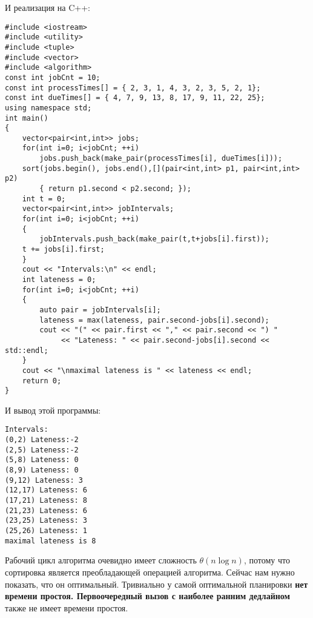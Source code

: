 \vspace{\baselineskip}
И реализация на C++:

\vspace{\baselineskip}
\begin{tcolorbox}
\begin{verbatim}
#include <iostream>
#include <utility>
#include <tuple>
#include <vector>
#include <algorithm>
const int jobCnt = 10;
const int processTimes[] = { 2, 3, 1, 4, 3, 2, 3, 5, 2, 1};
const int dueTimes[] = { 4, 7, 9, 13, 8, 17, 9, 11, 22, 25};
using namespace std;
int main()
{
	vector<pair<int,int>> jobs;
	for(int i=0; i<jobCnt; ++i)
		jobs.push_back(make_pair(processTimes[i], dueTimes[i]));
	sort(jobs.begin(), jobs.end(),[](pair<int,int> p1, pair<int,int> p2)
		{ return p1.second < p2.second; });
	int t = 0;
	vector<pair<int,int>> jobIntervals;
	for(int i=0; i<jobCnt; ++i)
	{
		jobIntervals.push_back(make_pair(t,t+jobs[i].first));
	t += jobs[i].first;
	}
	cout << "Intervals:\n" << endl;
	int lateness = 0;
	for(int i=0; i<jobCnt; ++i)
	{
		auto pair = jobIntervals[i];
		lateness = max(lateness, pair.second-jobs[i].second);
		cout << "(" << pair.first << "," << pair.second << ") "
			 << "Lateness: " << pair.second-jobs[i].second << std::endl;
	}
	cout << "\nmaximal lateness is " << lateness << endl;
	return 0;
}
\end{verbatim}
\end{tcolorbox}

\vspace{\baselineskip}
И вывод этой программы:

\vspace{\baselineskip}
\begin{tcolorbox}
\begin{verbatim}
Intervals:
(0,2) Lateness:-2
(2,5) Lateness:-2
(5,8) Lateness: 0
(8,9) Lateness: 0
(9,12) Lateness: 3
(12,17) Lateness: 6
(17,21) Lateness: 8
(21,23) Lateness: 6
(23,25) Lateness: 3
(25,26) Lateness: 1
maximal lateness is 8
\end{verbatim}
\end{tcolorbox}

\vspace{\baselineskip}
Рабочий цикл алгоритма очевидно имеет сложность $\theta(n \log n)$, потому что сортировка является преобладающей операцией алгоритма. Сейчас нам нужно показать, что он оптимальный. Тривиально у самой оптимальной планировки \textbf{нет времени простоя. Первоочередный вызов с наиболее ранним дедлайном} также не имеет времени простоя.

